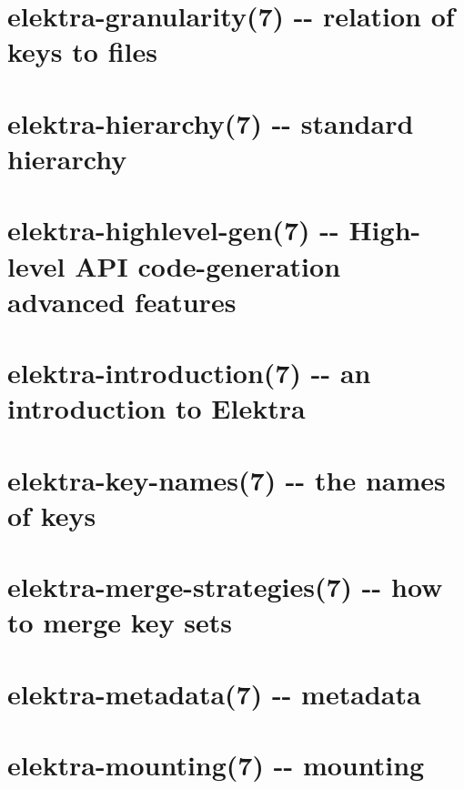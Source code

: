 \documentclass[twoside]{book}
\newcommand{\+}{\discretionary{\mbox{\scriptsize$\hookleftarrow$}}{}{}}
\begin{document}
\chapter{elektra-\/granularity(7) -\/-\/ relation of keys to files}
\label{doc_help_elektra-granularity_md}

\chapter{elektra-\/hierarchy(7) -\/-\/ standard hierarchy}
\label{doc_help_elektra-hierarchy_md}

\chapter{elektra-\/highlevel-\/gen(7) -\/-\/ High-\/level A\+PI code-\/generation advanced features}
\label{doc_help_elektra-highlevel-gen_md}

\chapter{elektra-\/introduction(7) -\/-\/ an introduction to Elektra}
\label{doc_help_elektra-introduction_md}

\chapter{elektra-\/key-\/names(7) -\/-\/ the names of keys}
\label{doc_help_elektra-key-names_md}

\chapter{elektra-\/merge-\/strategies(7) -\/-\/ how to merge key sets}
\label{doc_help_elektra-merge-strategy_md}

\chapter{elektra-\/metadata(7) -\/-\/ metadata}
\label{doc_help_elektra-metadata_md}

\chapter{elektra-\/mounting(7) -\/-\/ mounting}
\label{doc_help_elektra-mounting_md}

\end{document}
